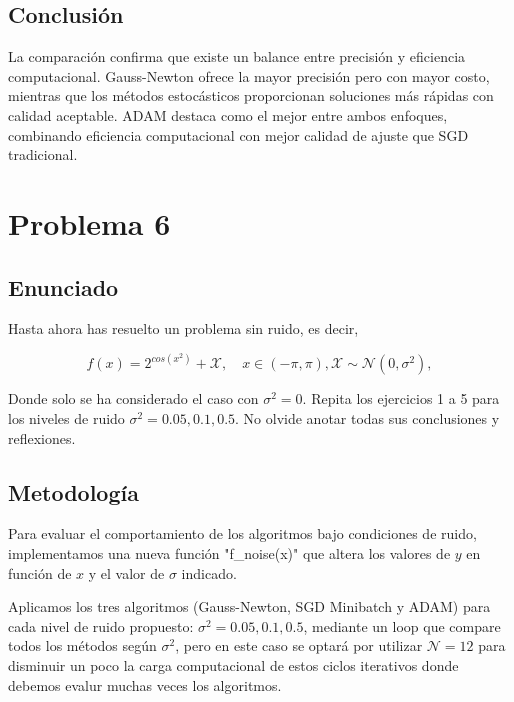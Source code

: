 \documentclass{article}
\begin{document}
\subsection{Conclusión}

La comparación confirma que existe un balance entre precisión y eficiencia computacional. Gauss-Newton ofrece la mayor precisión pero con mayor costo, mientras que los métodos estocásticos proporcionan soluciones más rápidas con calidad aceptable. ADAM destaca como el mejor entre ambos enfoques, combinando eficiencia computacional con mejor calidad de ajuste que SGD tradicional.


\section{Problema 6}

\subsection{Enunciado}

Hasta ahora has resuelto un problema sin ruido, es decir,

\begin{equation*}
    f(x)=2^{cos(x^2)}+\mathcal{X}, \quad x \in (-\pi,\pi), \mathcal{X} \sim \mathcal{N}(0,\sigma^{2}),
\end{equation*}

Donde solo se ha considerado el caso con $\sigma^2=0$. Repita los ejercicios 1 a 5 para los niveles de ruido $\sigma^2 = 0.05,0.1,0.5$. No olvide anotar todas sus conclusiones y reflexiones.

\subsection{Metodología}

Para evaluar el comportamiento de los algoritmos bajo condiciones de ruido, implementamos una nueva función "f\_noise(x)" que altera los valores de $y$ en función de $x$ y el valor de $\sigma$ indicado.

Aplicamos los tres algoritmos (Gauss-Newton, SGD Minibatch y ADAM) para cada nivel de ruido propuesto: $\sigma^2 = 0.05, 0.1, 0.5$, mediante un loop que compare todos los métodos según $\sigma^2$, pero en este caso se optará por utilizar $\mathcal{N}=12$ para disminuir un poco la carga computacional de estos ciclos iterativos donde debemos evalur muchas veces los algoritmos.
\end{document}
